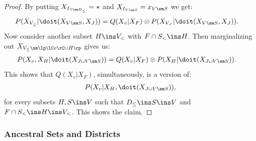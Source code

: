 \begin{Lem}
\begin{proof}
   By putting $X_{I_{S \sm D_\le}} = \star$ and $X_{I_{V \sm S}} = x_{V \sm S}$ we get:
   \begin{align*}
       P(X_{V_\le}|\doit(X_{V \sm S},X_J)) &= Q(X_v|X_F) \otimes P(X_{V_<}|\doit(X_{V \sm S},X_J)).
   \end{align*}
 Now consider another subset $H \ins V_<$ with $F \cap S_< \ins  H$. 
 Then marginalizing out $X_{V_\le \sm \lp \lC v \rC \cup H \rp}$ gives us:
   \begin{align*}
   P(X_v,X_H|\doit(X_{J \cup V \sm S})) &= Q(X_v|X_F) \otimes P(X_H|\doit(X_{J \cup V \sm S})).
   \end{align*}
 This shows that $Q(X_v|X_F)$, simultaneously, is a version of:
   \begin{align*} P(X_v|X_H,\doit(X_{J \cup V\sm S})), 
    \end{align*}
   for every subsets $H,S \ins V$ such that $D_\le \ins S \ins V$ and $F \cap S_< \ins  H \ins V_<$.
  This shows the claim.
     \end{proof}
\end{Lem}


\subsubsection{Ancestral Sets and Districts}

